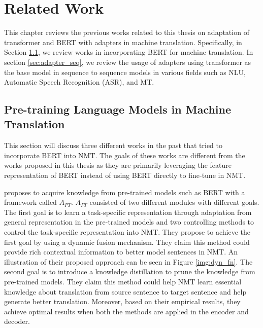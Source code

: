 \chapter{Related Work}

This chapter reviews the previous works related to this thesis on adaptation of transformer and BERT with adapters in machine translation. Specifically, in Section \ref{sec:prelm_mt}, we review works in incorporating BERT for machine translation. In section \ref{sec:adapter_seq}, we review the usage of adapters using transformer as the base model in sequence to sequence models in various fields such as NLU, Automatic Speech Recognition (ASR), and MT.

\section{Pre-training Language Models in Machine Translation}
\label{sec:prelm_mt}

This section will discuss three different works in the past that tried to incorporate BERT into NMT. The goals of these works are different from the works proposed in this thesis as they are primarily leveraging the feature representation of BERT instead of using BERT directly to fine-tune in NMT.

\cite{weng2020acquiring} proposes to acquire knowledge from pre-trained models such as BERT with a framework called $A_{PT}$. $A_{PT}$ consisted of two different modules with different goals. The first goal is to learn a task-specific representation through adaptation from general representation in the pre-trained models and two controlling methods to control the task-specific representation into NMT. They propose to achieve the first goal by using a dynamic fusion mechanism. They claim this method could provide rich contextual information to better model sentences in NMT. An illustration of their proposed approach can be seen in Figure \ref{img:dyn_fn}. The second goal is to introduce a knowledge distillation to prune the knowledge from pre-trained models. They claim this method could help NMT learn essential knowledge about translation from source sentence to target sentence and help generate better translation. Moreover, based on their empirical results, they achieve optimal results when both the methods are applied in the encoder and decoder.


